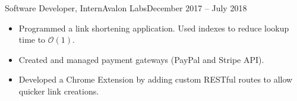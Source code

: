 \begin{cvsubsection}{Software Developer, Intern}{Avalon Labs}{December 2017 -- July 2018}
	\begin{itemize}
		\item Programmed a link shortening application. Used indexes to reduce lookup time to $\mathcal{O}(1)$.
		\item Created and managed payment gateways (PayPal and Stripe API).
		\item Developed a Chrome Extension by adding custom RESTful routes to allow quicker link creations.
	\end{itemize}
\end{cvsubsection}